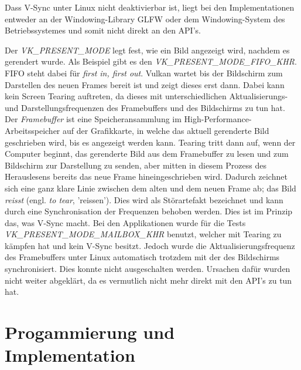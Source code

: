 \documentclass[titlepage, 11pt, a4paper, ngerman]{article}
\begin{document}
Dass V-Sync unter Linux nicht deaktivierbar ist, liegt bei den Implementationen entweder an der Windowing-Library \acrshort{GLFW} oder dem Windowing-System des Betriebssystemes und somit nicht direkt an den \acrshort{API}'s.\par 
Der \textit{VK\_PRESENT\_MODE} legt fest, wie ein Bild angezeigt wird, nachdem es gerendert wurde. Als Beispiel gibt es den \textit{VK\_PRESENT\_MODE\_FIFO\_KHR}. FIFO steht dabei für \textit{first in, first out}. Vulkan wartet bis der Bildschirm zum Darstellen des neuen \glspl{Frame} bereit ist und zeigt dieses erst dann. Dabei kann kein Screen Tearing auftreten, da dieses mit unterschiedlichen Aktualisierungs- und Darstellungsfrequenzen des Framebuffers und des Bildschirms zu tun hat. Der \textit{Framebuffer} ist eine Speicheransammlung im High-Performance-Arbeitsspeicher auf der Grafikkarte, in welche das aktuell gerenderte Bild geschrieben wird, bis es angezeigt werden kann. Tearing tritt dann auf, wenn der Computer beginnt, das gerenderte Bild aus dem Framebuffer zu lesen und zum Bildschirm zur Darstellung zu senden, aber mitten in diesem Prozess des Herauslesens bereits das neue \gls{Frame} hineingeschrieben wird. Dadurch zeichnet sich eine ganz klare Linie zwischen dem alten und dem neuen \gls{Frame} ab; das Bild \textit{reisst} (engl. \textit{to tear}, 'reissen'). Dies wird als Störartefakt bezeichnet und kann durch eine Synchronisation der Frequenzen behoben werden. Dies ist im Prinzip das, was V-Sync macht. Bei den Applikationen wurde für die Tests \textit{VK\_PRESENT\_MODE\_MAILBOX\_KHR} benutzt, welcher mit Tearing zu kämpfen hat und kein V-Sync besitzt. Jedoch wurde die Aktualisierungsfrequenz des Framebuffers unter Linux automatisch trotzdem mit der des Bildschirms synchronisiert. Dies konnte nicht ausgeschalten werden. Ursachen dafür wurden nicht weiter abgeklärt, da es vermutlich nicht mehr direkt mit den \acrshort{API}'s zu tun hat.

\newpage
\section{Progammierung und Implementation}
\end{document}
